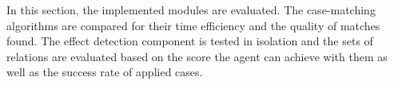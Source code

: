 In this section, the implemented modules are evaluated. The case-matching algorithms are compared for their time efficiency and the quality of matches found.
The effect detection component is tested in isolation and the sets of relations are evaluated based on the score the agent can achieve with them as well as the success rate of applied cases.

